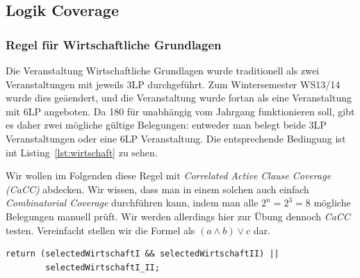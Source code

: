 \documentclass[ngerman]{article}
\begin{document}
\subsection{Logik Coverage}

\subsubsection{Regel für Wirtschaftliche Grundlagen}

Die Veranstaltung Wirtschaftliche Grundlagen wurde traditionell als zwei Veranstaltungen mit jeweils 3LP durchgeführt.
Zum Wintersemester WS13/14 wurde dies geäendert, und die Veranstaltung wurde fortan als eine Veranstaltung mit 6LP angeboten.
Da 180 für unabhängig vom Jahrgang funktionieren soll, gibt es daher zwei mögliche gültige Belegungen: entweder man belegt beide 3LP Veranstaltungen oder eine 6LP Veranstaltung.
Die entsprechende Bedingung ist int Listing~\ref{lst:wirtschaft} zu sehen.

Wir wollen im Folgenden diese Regel mit \emph{Correlated Active Clause Coverage (CaCC)} abdecken.
Wir wissen, dass man in einem solchen auch einfach \emph{Combinatorial Coverage} durchführen kann, indem man alle $2^n = 2^3 = 8$ mögliche Belegungen manuell prüft.
Wir werden allerdings hier zur Übung dennoch \emph{CaCC} testen.
Vereinfacht stellen wir die Formel als $(a \land b) \lor c$ dar.
\begin{lstlisting}[caption=Wirtschafts-Regel,label={lst:wirtschaft},frame=single]
return (selectedWirtschaftI && selectedWirtschaftII) ||
        selectedWirtschaftI_II;
\end{lstlisting}
\end{document}
